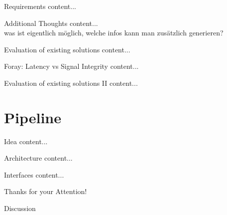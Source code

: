 \documentclass{beamer}
\begin{document}
	
	\begin{frame}{Requirements}
		content...
	\end{frame}
	
	
	\begin{frame}{Additional Thoughts}
		content...\\
		was ist eigentlich möglich, welche infos kann man zusätzlich generieren?
	\end{frame}

	\begin{frame}{Evaluation of existing solutions}
		content...
	\end{frame}
	
	\begin{frame}{Foray: Latency vs Signal Integrity}
		content...
	\end{frame}
	
	\begin{frame}{Evaluation of existing solutions II}
		content...
	\end{frame}

	\section{Pipeline}
	
	\begin{frame}{Idea}
		content...
	\end{frame}
	
	\begin{frame}{Architecture}
		content...
	\end{frame}
	
	\begin{frame}{Interfaces}
		content...
	\end{frame}
	
	\begin{frame}{}
		\begin{alertblock}{Thanks for your Attention!}
		\end{alertblock}
	\end{frame}
	
	\begin{frame}{}
		\begin{alertblock}{Discussion}
		\end{alertblock}
	\end{frame}
	
\end{document}
